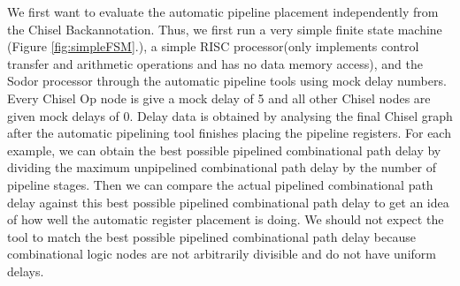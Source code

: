 \begin{table}[htb]
	\centering
	\caption{{\bf Pipelined Design Delay Data} The delays are obtained from analyzing the Chisel node graph pre synthesis. The delays are unitless because they are obtained from arbitrary mock delays assigned for the sake of independently testing the automatic pipeline placement tool}
	\label{fig:mock_delays}
\end{table}


We first want to evaluate the automatic pipeline placement independently from the Chisel Backannotation. Thus, we first run a very simple finite state machine (Figure \ref{fig:simpleFSM}.), a simple RISC processor(only implements control transfer and arithmetic operations and has no data memory access), and the Sodor processor through the automatic pipeline tools using mock delay numbers. Every Chisel Op node is give a mock delay of 5 and all other Chisel nodes are given mock delays of 0. Delay data is obtained by analysing the final Chisel graph after the automatic pipelining tool finishes placing the pipeline registers. For each example, we can obtain the best possible pipelined combinational path delay by dividing the maximum unpipelined combinational path delay by the number of pipeline stages. Then we can compare the actual pipelined combinational path delay against this best possible pipelined combinational path delay to get an idea of how well the automatic register placement is doing. We should not expect the tool to match the best possible pipelined combinational path delay because combinational logic nodes are not arbitrarily divisible and do not have uniform delays.

